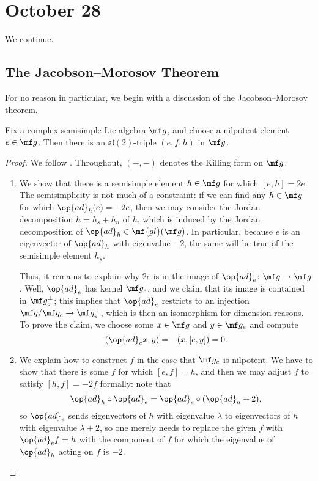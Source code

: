 \documentclass[../notes.tex]{subfiles}
\begin{document}
\section{October 28}
We continue.

\subsection{The Jacobson--Morosov Theorem}
For no reason in particular, we begin with a discussion of the Jacobson--Morosov theorem.
\begin{theorem} \label{thm:jacobson-morosov}
	Fix a complex semisimple Lie algebra $\mf g$, and choose a nilpotent element $e\in\mf g$. Then there is an $\mathfrak{sl}(2)$-triple $(e,f,h)$ in $\mf g$.
\end{theorem}
\begin{proof}
	We follow \cite[Section~3.7]{chriss-ginzburg-rep-theory}. Throughout, $(-,-)$ denotes the Killing form on $\mf g$.
	\begin{enumerate}
		\item We show that there is a semisimple element $h\in\mf g$ for which $[e,h]=2e$. The semisimplicity is not much of a constraint: if we can find any $h\in\mf g$ for which $\op{ad}_h(e)=-2e$, then we may consider the Jordan decomposition $h=h_s+h_n$ of $h$, which is induced by the Jordan decomposition of ${\op{ad}_h}\in\mf{gl}(\mf g)$. In particular, because $e$ is an eigenvector of $\op{ad}_h$ with eigenvalue $-2$, the same will be true of the semisimple element $h_s$.

		Thus, it remains to explain why $2e$ is in the image of $\op{ad}_e\colon\mf g\to\mf g$. Well, $\op{ad}_e$ has kernel $\mf g_e$, and we claim that its image is contained in $\mf g_e^\perp$; this implies that $\op{ad}_e$ restricts to an injection $\mf g/\mf g_e\to\mf g_e^\perp$, which is then an isomorphism for dimension reasons. To prove the claim, we choose some $x\in\mf g$ and $y\in\mf g_e$ and compute
		\[(\op{ad}_ex,y)=-(x,[e,y])=0.\]

		\item We explain how to construct $f$ in the case that $\mf g_e$ is nilpotent. We have to show that there is some $f$ for which $[e,f]=h$, and then we may adjust $f$ to satisfy $[h,f]=-2f$ formally: note that
		\[{\op{ad}_h\circ\op{ad}_e}={\op{ad}_e\circ({\op{ad}_h}+2)},\]
		so $\op{ad}_e$ sends eigenvectors of $h$ with eigenvalue $\lambda$ to eigenvectors of $h$ with eigenvalue $\lambda+2$, so one merely needs to replace the given $f$ with $\op{ad}_ef=h$ with the component of $f$ for which the eigenvalue of $\op{ad}_h$ acting on $f$ is $-2$.
		

\end{enumerate}
\end{proof}
\end{document}
